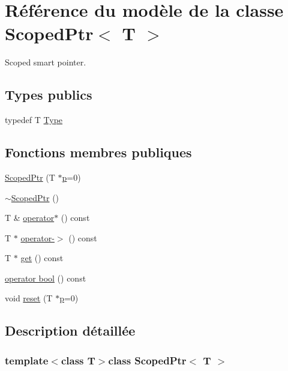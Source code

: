 \hypertarget{class_scoped_ptr}{}\section{Référence du modèle de la classe Scoped\+Ptr$<$ T $>$}
\label{class_scoped_ptr}


Scoped smart pointer.  


\subsection*{Types publics}
\begin{DoxyCompactItemize}
\item 
typedef T \hyperlink{class_scoped_ptr_adaf477f37ed2e00e76d916637be354cd}{Type}
\end{DoxyCompactItemize}
\subsection*{Fonctions membres publiques}
\begin{DoxyCompactItemize}
\item 
\hyperlink{class_scoped_ptr_a7a93e80d248708cbeb5d633ff2efd5cb}{Scoped\+Ptr} (T $\ast$\hyperlink{060__command__switch_8tcl_a15229b450f26d8fa1c10bea4f3279f4d}{p}=0)
\item 
\hyperlink{class_scoped_ptr_a9e668ee0dc2b1b993c8cb0bdf06b532b}{$\sim$\+Scoped\+Ptr} ()
\item 
T \& \hyperlink{class_scoped_ptr_a61273c4a21de1b5eb4b5dedd00ddefc0}{operator$\ast$} () const 
\item 
T $\ast$ \hyperlink{class_scoped_ptr_a37eef3b572d5674362b24d79407a847d}{operator-\/$>$} () const 
\item 
T $\ast$ \hyperlink{class_scoped_ptr_a51eb663c947af607eef4853aefb4e05b}{get} () const 
\item 
\hyperlink{class_scoped_ptr_afd8e3bca25746cb1b71da05178d9eceb}{operator bool} () const 
\item 
void \hyperlink{class_scoped_ptr_a9b5950519b300692fcb6c46d121caaf4}{reset} (T $\ast$\hyperlink{060__command__switch_8tcl_a15229b450f26d8fa1c10bea4f3279f4d}{p}=0)
\end{DoxyCompactItemize}


\subsection{Description détaillée}
\subsubsection*{template$<$class T$>$class Scoped\+Ptr$<$ T $>$}

